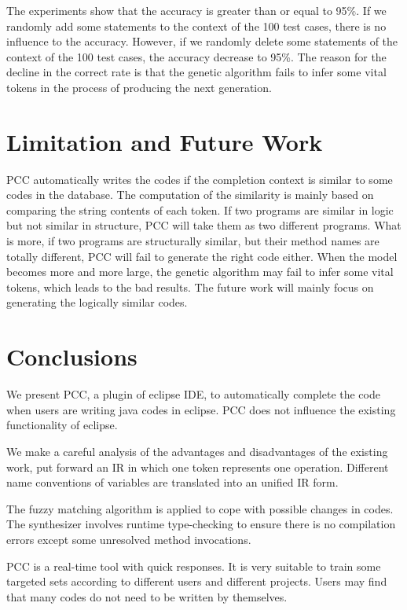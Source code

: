 \documentclass{sig-alternate-05-2015}
\begin{document}
The experiments show that the accuracy is greater than or equal to 95\%. If we randomly add some statements to the context of the 100 test cases, there is no influence to the accuracy. However, if we randomly delete some statements of the context of the 100 test cases, the accuracy decrease to 95\%. The reason for the decline in the correct rate is that the genetic algorithm fails to infer some vital tokens in the process of producing the next generation.

\section{Limitation and Future Work}

PCC automatically writes the codes if the completion context is similar to some codes in the database. The computation of the similarity is mainly based on comparing the string contents of each token. If two programs are similar in logic but not similar in structure, PCC will take them as two different programs. What is more, if two programs are structurally similar, but their method names are totally different, PCC will fail to generate the right code either. When the model becomes more and more large, the genetic algorithm may fail to infer some vital tokens, which leads to the bad results. The future work will mainly focus on generating the logically similar codes.

\section{Conclusions}

We present PCC, a plugin of eclipse IDE, to automatically complete the code when users are writing java codes in eclipse.
PCC does not influence the existing functionality of eclipse.

We make a careful analysis of the advantages and disadvantages of the existing work, put forward an IR in which one token represents one operation. Different name conventions of variables are translated into an unified IR form.

The fuzzy matching algorithm is applied to cope with possible changes in codes. The synthesizer involves runtime type-checking to ensure there is no compilation errors except some unresolved method invocations.

PCC is a real-time tool with quick responses. It is very suitable to train some targeted sets according to different users and different projects. Users may find that many codes do not need to be written by themselves.
\end{document}
